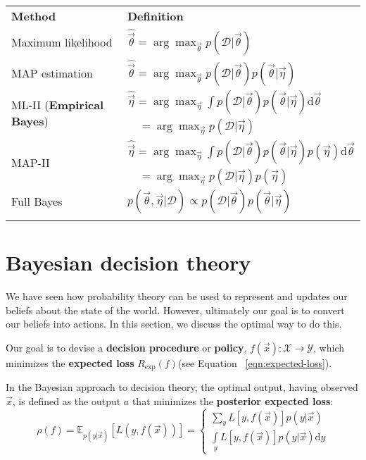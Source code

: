 \begin{table}
\centering
\begin{tabular}{ll}
\hline\noalign{\smallskip}
\textbf{Method} & \textbf{Definition} \\
\noalign{\smallskip}\svhline\noalign{\smallskip}
Maximum likelihood & $\hat{\vec{\theta}}=\arg\max_{\vec{\theta}} p(\mathcal{D}|\vec{\theta})$ \\
MAP estimation & $\hat{\vec{\theta}}=\arg\max_{\vec{\theta}} p(\mathcal{D}|\vec{\theta})p(\vec{\theta}|\vec{\eta})$ \\
\multirow{2}{*}{ML-II (\textbf{Empirical Bayes})} & $\hat{\vec{\eta}}=\arg\max_{\vec{\eta}} \int p(\mathcal{D}|\vec{\theta})p(\vec{\theta}|\vec{\eta})\mathrm{d}\vec{\theta}$ \\
                                                  & $\quad =\arg\max_{\vec{\eta}}p(\mathcal{D}|\vec{\eta})$ \\
\multirow{2}{*}{MAP-II} & $\hat{\vec{\eta}}=\arg\max_{\vec{\eta}} \int p(\mathcal{D}|\vec{\theta})p(\vec{\theta}|\vec{\eta})p(\vec{\eta})\mathrm{d}\vec{\theta}$ \\
                        & $\quad =\arg\max_{\vec{\eta}}p(\mathcal{D}|\vec{\eta})p(\vec{\eta})$ \\
Full Bayes & $p(\vec{\theta},\vec{\eta}|\mathcal{D}) \propto p(\mathcal{D}|\vec{\theta})p(\vec{\theta}|\vec{\eta})$ \\
\noalign{\smallskip}\hline
\end{tabular}
\end{table}


\section{Bayesian decision theory}
\label{sec:Bayesian-decision-theory}
We have seen how probability theory can be used to represent and updates our beliefs about the state of the world. However, ultimately our goal is to convert our beliefs into actions. In this section, we discuss the optimal way to do this.

Our goal is to devise a \textbf{decision procedure} or \textbf{policy}, $f(\vec{x}) : \mathcal{X} \rightarrow \mathcal{Y}$, which minimizes the \textbf{expected loss} $R_{\mathrm{exp}}(f)$(see Equation ~\ref{eqn:expected-loss}).

In the Bayesian approach to decision theory, the optimal output, having observed $\vec{x}$, is defined as the output $a$ that minimizes the \textbf{posterior expected loss}:
\begin{equation}
\rho(f)=\mathbb{E}_{p(y|\vec{x})}[L(y,f(\vec{x}))]=\begin{cases}
\sum\limits_y L[y,f(\vec{x})]p(y|\vec{x}) \\
\int\limits_y L[y,f(\vec{x})]p(y|\vec{x})\mathrm{d}y
\end{cases}
\end{equation}

